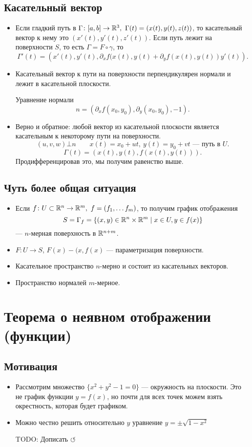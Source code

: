 \subsection{Касательный вектор}
\begin{itemize}
    \item  Если гладкий путь в $ \Gamma \colon [a,b] \to  \mathbb{R}^3, ~\Gamma (t) = \left( x(t), y(t), z(t) \right)  $, то касательный вектор к нему это $ \left( x'(t), y'(t),z'(t) \right) $.  Если путь лежит на поверхности $ S$, то есть $ \Gamma = F \circ \gamma $, то
	\[
	    \Gamma '(t) = \left( x'(t), y'(t), \partial _xf(x(t), y(t) + \partial _yf(x(t), y(t))y'(t) \right)
	.\]
    \item Касательный вектор к пути на поверхности перпендикулярен нормали и лежит в касательной плоскости.

	Уравнение нормали
	\[
	    n=\left( \partial _xf(x_0, y_0), \partial _y(x_0, y_0), -1 \right)
	.\]
    \item Верно и обратное:  любой вектор из касательной плоскости является касательным к некоторому пути на поверхности.
	\[
	    (u, v, w) \bot n \qquad x(t) = x_0+ ut, ~y(t) =y_0+vt \text{ --- путь в } U
	.\]
	\[
	    \Gamma (t) = (x(t), y(t), f(x(t), y(t)))
	.\]
	Продифференцировав это, мы получим равенство выше.
\end{itemize}
\subsection{Чуть более общая ситуация}
\begin{itemize}
    \item Если $ f\colon U \subset \mathbb{R}^{n} \to  \mathbb{R}^{m} , ~ f= (f_1, \ldots f_m)$, то получим график отображения
	\[
	    S = \Gamma _f = \{(x, y) \in \mathbb{R}^{n} \times \mathbb{R}^{m} \mid x \in U, y \in f(x)\}
	\]
	--- $ n$-мерная поверхность в  $ \mathbb{R}^{n+m}$.
    \item $ F\colon U \to  S$, $ F(x) - (x, f(x)$ --- параметризация поверхности.
    \item Касательное пространство $ n$-мерно и состоит из касательных векторов.
    \item Пространство нормалей  $ m$-мерное.
\end{itemize}
\section{Теорема о неявном отображении (функции)}
\subsection{Мотивация}
\begin{itemize}
    \item
	Рассмотрим множество $ \{x^2+y^2-1= 0\}$ --- окружность на плоскости. Это не график функции $ y = f(x)$, но почти для всех точек можем взять окрестность, которая будет графиком.
    \item  Можно честно решить относительно $ y$ уравнение  $ y = \pm \sqrt{1-x^2 } $

	TODO: Дописать $\circlearrowleft$
\end{itemize}

